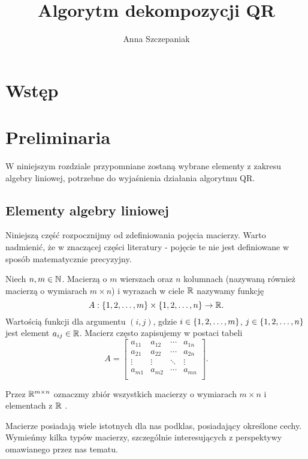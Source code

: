\documentclass[10pt,a4paper]{report}
\author{Anna Szczepaniak}
\title{Algorytm dekompozycji QR}
\newcommand{\mx}[1]{{#1}}
\begin{document}
\maketitle


\tableofcontents

\chapter{Wstęp}

\chapter{Preliminaria}

W niniejszym rozdziale przypomniane zostaną wybrane elementy z zakresu algebry liniowej, potrzebne do wyjaśnienia działania algorytmu QR.

\section{Elementy algebry liniowej} 

Niniejszą część rozpocznijmy od zdefiniowania pojęcia macierzy. Warto nadmienić, że w znaczącej części literatury - pojęcie te nie jest definiowane w sposób matematycznie precyzyjny.

\begin{definition}
Niech $n,m \in \mathbb{N}$. Macierzą o $m$ wierszach oraz $n$ kolumnach (nazywaną również macierzą o wymiarach $m \times n$) i wyrazach w ciele $\mathbb{R}$ nazywamy funkcję 
$$
\mx{A}: \set{1,2, \ldots ,m}\times \set{1,2, \ldots ,n} \to \setR.
$$
Wartością funkcji dla argumentu $(i,j)$, gdzie $i \in \left\lbrace {1,2, \ldots ,m} \right\rbrace$, $j \in \left\lbrace {1,2, \ldots ,n} \right\rbrace$ jest element $a_{ij} \in \mathbb{R}$. Macierz często zapisujemy w postaci tabeli
$$
\mx{A} = \begin{bmatrix}
 a_{11} & a_{12} & \cdots & a_{1n} \\
         a_{21} & a_{22} & \cdots & a_{2n} \\
         \vdots & \vdots & \ddots & \vdots \\
         a_{m1} & a_{m2} & \cdots & a_{mn} \\
\end{bmatrix}.
$$

Przez $\mathbb{R}^{m \times n}$ oznaczmy zbiór wszystkich macierzy o wymiarach $m \times n$ i elementach z $\mathbb{R}$ .
\end{definition}

Macierze posiadają wiele istotnych dla nas podklas, posiadający określone cechy. Wymieńmy kilka typów macierzy, szczególnie interesujących z perspektywy omawianego przez nas tematu.
\end{document}

